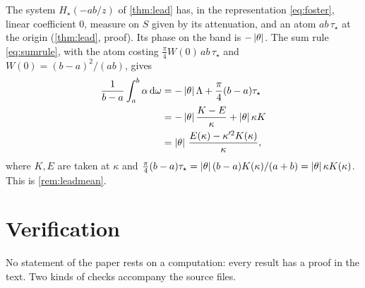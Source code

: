 The system $H_\star(-ab/z)$ of \cref{thm:lead} has, in the representation
\eqref{eq:foster}, linear coefficient $0$, measure on $S$ given by its
attenuation, and an atom $ab\,\tau_\star$ at the origin (\cref{thm:lead},
proof). Its phase on the band is $-\left|\theta\right|$. The sum rule
\eqref{eq:sumrule}, with the atom costing $\frac\pi4W(0)\,ab\,\tau_\star$ and
$W(0)=(b-a)^2/(ab)$, gives
\begin{align*}
\frac1{b-a}\int_a^b\alpha\,\mathrm d\omega&=-\left|\theta\right|\Lambda+\frac\pi4(b-a)\tau_\star\\
&=-\left|\theta\right|\frac{K-E}\kappa+\left|\theta\right|\kappa K\\
&=\left|\theta\right|\,\frac{E(\kappa)-\kappa'^2K(\kappa)}\kappa ,
\end{align*}
where $K,E$ are taken at $\kappa$ and
$\frac\pi4(b-a)\tau_\star=\left|\theta\right|(b-a)K(\kappa)/(a+b)=\left|\theta\right|\kappa K(\kappa)$.
This is \cref{rem:leadmean}.

\section{Verification}\label{app:verification}

No statement of the paper rests on a computation: every result has a proof
in the text. Two kinds of checks accompany the source files.

